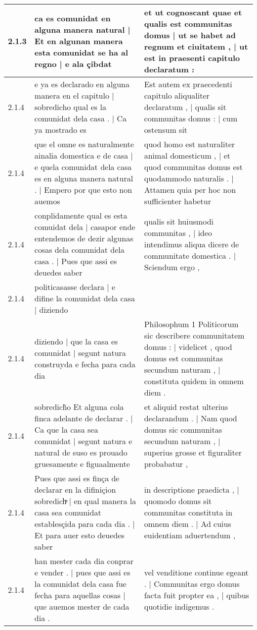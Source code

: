 \begin{tabular}{|p{1cm}|p{6.5cm}|p{6.5cm}|}
2.1.3 & ca es comunidat en alguna manera natural | Et en algunan manera esta comunidat se ha al regno | e ala çibdat & et ut cognoscant quae et qualis est communitas domus | ut se habet ad regnum et ciuitatem , | ut est in praesenti capitulo declaratum : \\\hline
2.1.4 & e ya es declarado en alguna manera en el capitulo | sobredicho qual es la comunidat dela casa . | Ca ya mostrado es & Est autem ex praecedenti capitulo aliqualiter declaratum , | qualis sit communitas domus : | cum ostensum sit \\\hline
2.1.4 & que el omne es naturalmente ainalia domestica e de casa | e quela comunidat dela casa es en alguna manera natural . | Empero por que esto non auemos & quod homo est naturaliter animal domesticum , | et quod communitas domus est quodammodo naturalis . | Attamen quia per hoc non sufficienter habetur \\\hline
2.1.4 & conplidamente qual es esta comuidat dela | casapor ende entendemos de dezir algunas cosas dela comunidat dela casa . | Pues que assi es deuedes saber & qualis sit huiusmodi communitas , | ideo intendimus aliqua dicere de communitate domestica . | Sciendum ergo , \\\hline
2.1.4 & politicasasse declara | e difine la comunidat dela casa | diziendo &  \\\hline
2.1.4 & diziendo | que la casa es comunidat | segunt natura construyda e fecha para cada dia & Philosophum 1 Politicorum sic describere communitatem domus : | videlicet , quod domus est communitas secundum naturam , | constituta quidem in omnem diem . \\\hline
2.1.4 & sobredich̃o Et alguna cola finca adelante de declarar . | Ca que la casa sea comunidat | segunt natura e natural de suso es prouado gruesamente e figuaalmente & et aliquid restat ulterius declarandum . | Nam quod domus sic communitas secundum naturam , | superius grosse et figuraliter probabatur , \\\hline
2.1.4 & Pues que assi es finça de declarar en la difiniçion sobredichͣ | en qual manera la casa sea comunidat establesçida para cada dia . | Et para auer esto deuedes saber & in descriptione praedicta , | quomodo domus sit communitas constituta in omnem diem . | Ad cuius euidentiam aduertendum , \\\hline
2.1.4 & han mester cada dia conprar e vender . | pues que assi es la comunidat dela casa fue fecha para aquellas cosas | que auemos mester de cada dia . & vel venditione continue egeant . | Communitas ergo domus facta fuit propter ea , | quibus quotidie indigemus . \\\hline

\end{tabular}
